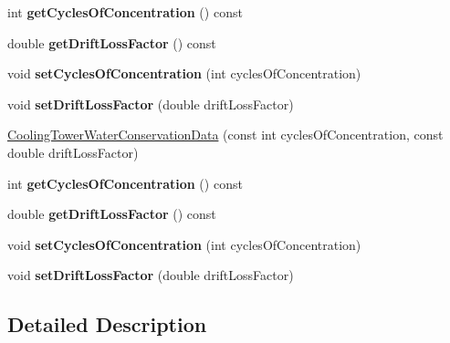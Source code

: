 \begin{DoxyCompactItemize}
int {\bfseries get\+Cycles\+Of\+Concentration} () const
\item 
\mbox{\label{class_cooling_tower_water_conservation_data_a19e62ebc3cc9e41a05d485f3ead65465}} 
double {\bfseries get\+Drift\+Loss\+Factor} () const
\item 
\mbox{\label{class_cooling_tower_water_conservation_data_a99ed26b5455d7f9f59bdb0658de5fa82}} 
void {\bfseries set\+Cycles\+Of\+Concentration} (int cycles\+Of\+Concentration)
\item 
\mbox{\label{class_cooling_tower_water_conservation_data_a3b4df83b89870a1d47e731ab2c409014}} 
void {\bfseries set\+Drift\+Loss\+Factor} (double drift\+Loss\+Factor)
\item 
\hyperlink{class_cooling_tower_water_conservation_data_a14cdf792dfd962c99a5ad59800d28ff6}{Cooling\+Tower\+Water\+Conservation\+Data} (const int cycles\+Of\+Concentration, const double drift\+Loss\+Factor)
\item 
\mbox{\label{class_cooling_tower_water_conservation_data_a28f6c65b7d5bd5a02c539e9f85948618}} 
int {\bfseries get\+Cycles\+Of\+Concentration} () const
\item 
\mbox{\label{class_cooling_tower_water_conservation_data_a19e62ebc3cc9e41a05d485f3ead65465}} 
double {\bfseries get\+Drift\+Loss\+Factor} () const
\item 
\mbox{\label{class_cooling_tower_water_conservation_data_a99ed26b5455d7f9f59bdb0658de5fa82}} 
void {\bfseries set\+Cycles\+Of\+Concentration} (int cycles\+Of\+Concentration)
\item 
\mbox{\label{class_cooling_tower_water_conservation_data_a3b4df83b89870a1d47e731ab2c409014}} 
void {\bfseries set\+Drift\+Loss\+Factor} (double drift\+Loss\+Factor)
\end{DoxyCompactItemize}


\subsection{Detailed Description}


